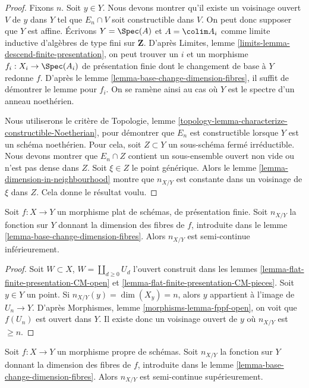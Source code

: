\begin{proof}
Fixons $n$. Soit $y \in Y$. Nous devons montrer qu'il existe un voisinage ouvert
$V$ de $y$ dans $Y$ tel que $E_n \cap V$ soit constructible dans $V$. On peut donc
supposer que $Y$ est affine. Écrivons $Y = \Spec(A)$ et
$A = \colim A_i$ comme limite inductive d'algèbres
de type fini sur $\mathbf{Z}$. D'après
Limites, lemme \ref{limits-lemma-descend-finite-presentation},
on peut trouver un $i$ et un morphisme $f_i : X_i \to \Spec(A_i)$ de
présentation finie dont le changement de base à $Y$ redonne $f$. D'après le
lemme \ref{lemma-base-change-dimension-fibres},
il suffit de démontrer le lemme pour $f_i$. On se ramène ainsi au
cas où $Y$ est le spectre d'un anneau noethérien.

\medskip\noindent
Nous utiliserons le critère de
Topologie, lemme \ref{topology-lemma-characterize-constructible-Noetherian},
pour démontrer que $E_n$ est constructible lorsque $Y$ est un schéma noethérien.
Pour cela, soit $Z \subset Y$ un sous-schéma fermé irréductible.
Nous devons montrer que $E_n \cap Z$ contient un sous-ensemble ouvert non vide
ou n'est pas dense dans $Z$. Soit $\xi \in Z$ le point générique. Alors le
lemme \ref{lemma-dimension-in-neighbourhood}
montre que $n_{X/Y}$ est constante dans un voisinage de $\xi$ dans $Z$.
Cela donne le résultat voulu.
\end{proof}

\begin{lemma}
\label{lemma-dimension-fibres-flat}
Soit $f : X \to Y$ un morphisme plat de schémas, de présentation finie. Soit
$n_{X/Y}$ la fonction sur $Y$ donnant la dimension des fibres de $f$,
introduite dans le lemme \ref{lemma-base-change-dimension-fibres}.
Alors $n_{X/Y}$ est semi-continue inférieurement.
\end{lemma}

\begin{proof}
Soit $W \subset X$, $W = \coprod_{d \geq 0} U_d$ l'ouvert construit dans les
lemmes \ref{lemma-flat-finite-presentation-CM-open} et
\ref{lemma-flat-finite-presentation-CM-pieces}.
Soit $y \in Y$ un point. Si $n_{X/Y}(y) = \dim(X_y) = n$, alors
$y$ appartient à l'image de $U_n \to Y$.
D'après Morphismes, lemme \ref{morphisms-lemma-fppf-open},
on voit que $f(U_n)$ est ouvert dans $Y$.
Il existe donc un voisinage ouvert de $y$ où
$n_{X/Y}$ est $\geq n$.
\end{proof}

\begin{lemma}
\label{lemma-dimension-fibres-proper}
Soit $f : X \to Y$ un morphisme propre de schémas. Soit
$n_{X/Y}$ la fonction sur $Y$ donnant la dimension des fibres de $f$,
introduite dans le lemme \ref{lemma-base-change-dimension-fibres}.
Alors $n_{X/Y}$ est semi-continue supérieurement.
\end{lemma}

